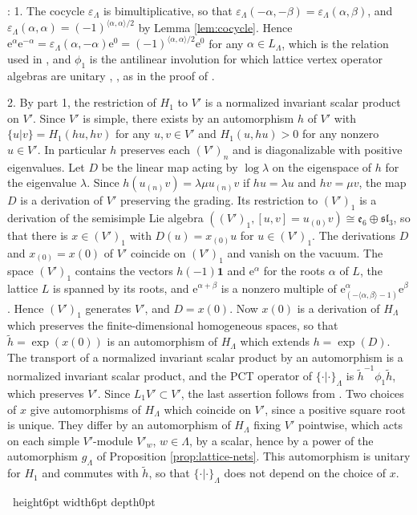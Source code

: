 \documentclass[leqno]{article}
\newcommand{\qed}{\hfill \vrule height6pt  width6pt depth0pt}
\newcommand{\epsi}{\varepsilon}
\newcommand{\e}{\mathrm{e}} %
\newenvironment{proof}[1][]{\noindent {\it Proof #1} : }{\hbox{~}\qed
\smallskip
}
\numberwithin{equation}{section}
\begin{document}
\begin{proof}
1. The cocycle $\epsi_\Lambda$ is bimultiplicative, so that $\epsi_\Lambda(-\alpha,-\beta) = \epsi_\Lambda(\alpha,\beta)$, and $\epsi_\Lambda(\alpha,\alpha) = (-1)^{\langle\alpha,\alpha\rangle/2}$ by Lemma \ref{lem:cocycle}. Hence $\e^\alpha\e^{-\alpha} = \epsi_\Lambda(\alpha,-\alpha)\e^0 = (-1)^{\langle\alpha,\alpha\rangle/2}\e^0$ for any $\alpha \in L_\Lambda$, which is the relation used in \cite[Lemma 4.11 p.~23]{DoL14}, and $\phi_1$ is the antilinear involution for which lattice vertex operator algebras are unitary \cite[Theorem 4.12 p.~24]{DoL14}, \cite[Example 5.9 p.~35]{CKLW18}, as in the proof of \cite[Theorem 10.10]{Arh26}.

2. By part 1, the restriction of $H_1$ to $V'$ is a normalized invariant scalar product on $V'$. Since $V'$ is simple, there exists by \cite[Proposition 5.19 p.~40]{CKLW18} an automorphism $h$ of $V'$ with $\{u|v\} = H_1(hu,hv)$ for any $u,v \in V'$ and $H_1(u,hu) > 0$ for any nonzero $u \in V'$. In particular $h$ preserves each $(V')_n$ and is diagonalizable with positive eigenvalues. Let $D$ be the linear map acting by $\log \lambda$ on the eigenspace of $h$ for the eigenvalue $\lambda$. Since $h(u_{(n)}v) = \lambda\mu  u_{(n)}v$ if $hu = \lambda u$ and $hv = \mu v$, the map $D$ is a derivation of $V'$ preserving the grading. Its restriction to $(V')_1$ is a derivation of the semisimple Lie algebra $((V')_1,[u,v] = u_{(0)}v) \cong \mathfrak e_6 \oplus \mathfrak{sl}_3$, so that there is $x \in (V')_1$ with $D(u) = x_{(0)}u$ for $u \in (V')_1$. The derivations $D$ and $x_{(0)} = x(0)$ of $V'$ coincide on $(V')_1$ and vanish on the vacuum. The space $(V')_1$ contains the vectors $h(-1)\mathbf 1$ and $\e^\alpha$ for the roots $\alpha$ of $L$, the lattice $L$ is spanned by its roots, and $\e^{\alpha+\beta}$ is a nonzero multiple of $\e^\alpha_{(-\langle\alpha,\beta\rangle-1)}\e^\beta$ \cite[Chapter 8]{FLM88}. Hence $(V')_1$ generates $V'$, and $D = x(0)$. Now $x(0)$ is a derivation of $H_\Lambda$ which preserves the finite-dimensional homogeneous spaces, so that $\tilde h = \exp(x(0))$ is an automorphism of $H_\Lambda$ which extends $h = \exp(D)$. The transport of a normalized invariant scalar product by an automorphism is a normalized invariant scalar product, and the PCT operator of $\{\cdot|\cdot\}_\Lambda$ is $\tilde h^{-1}\phi_1\tilde h$, which preserves $V'$. Since $L_1V' \subset V'$, the last assertion follows from \cite[Proposition 5.23 p.~43]{CKLW18}. Two choices of $x$ give automorphisms of $H_\Lambda$ which coincide on $V'$, since a positive square root is unique. They differ by an automorphism of $H_\Lambda$ fixing $V'$ pointwise, which acts on each simple $V'$-module $V'_w$, $w \in \Lambda$, by a scalar, hence by a power of the automorphism $g_\Lambda$ of Proposition \ref{prop:lattice-nets}. This automorphism is unitary for $H_1$ and commutes with $\tilde h$, so that $\{\cdot|\cdot\}_\Lambda$ does not depend on the choice of $x$.


\end{proof}
\end{document}
